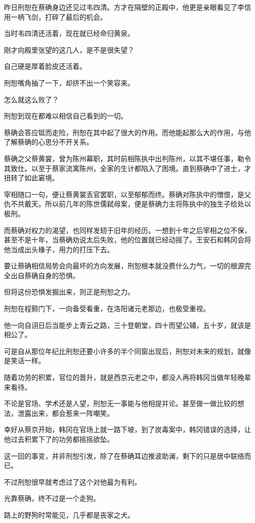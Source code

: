 昨日刑恕在蔡确身边还见过韦四清。方才在隔壁的正殿中，他更是亲眼看见了李信用一柄飞剑，打碎了最后的机会。

当时韦四清还活着，现在就已经命归黄泉。

刚才向殿里张望的这几人，是不是很失望？

自己硬是厚着脸皮还活着。

刑恕嘴角抽了一下，却挤不出一个笑容来。

怎么就这么败了？

刑恕到现在都难以相信自己看到的一切。

蔡确会答应铤而走险，刑恕在其中起了很大的作用。而他能起那么大的作用，与他了解蔡确的心思分不开关系。

蔡确之父蔡黄裳，曾为陈州幕职，其时前相陈执中出判陈州，以其不堪任事，勒令其致仕。以至于蔡家流寓陈州，全家的生计都陷入了困境。直到蔡确中了进士，才扭转了如此窘境。

宰相随口一句，便让蔡黄裳丢官罢职，以至郁郁而终。蔡确对陈执中的憎恨，是父仇不共戴天。所以前几年的陈世儒弑母案，便是蔡确力主将陈执中的独生子给处以极刑。

而蔡确对权力的渴望，也同样发轫于旧年的经历。一想到十年之后宰相之位不保，甚至不是十年，当蔡确劝说太后失败，他的位置就已经动摇了。王安石和韩冈会将他当成出头椽子，用力的打压下去。

要让蔡确相信局势会向最坏的方向发展，刑恕根本就没费什么力气，一切的根源完全出自蔡确自身的恐惧。

但将这份恐惧发掘出来，则正是刑恕之力。

刑恕在程颢门下，一向备受看重，在洛阳诸元老那边，也极受重视。

他一向自诩日后当能步上青云之路，三十登朝堂，四十而望公辅，五十岁，就该是相公了。

可是自从那位年纪比刑恕还要小许多的半个同窗出现后，刑恕对未来的规划，就像是笑话一样。

随着功劳的积累，官位的晋升，就是西京元老之中，都没人再将韩冈当做年轻晚辈来看待。

不论是官场、学术还是人望，刑恕无一事能与他相提并论。甚至做一做比较的想法，泄露出来，都会惹来一阵嘲笑。

幸好从蔡京开始，韩冈在官场上就一路下坡，到了炭毒案中，韩冈错误的选择，让他过去积累下了的功劳都摇摇欲坠。

这一回的事变，并非刑恕引发，除了在蔡确耳边推波助澜，剩下的只是居中联络而已。

不过刑恕很早就考虑过了这个对他最为有利。

光靠蔡确，终不过是一个走狗。

路上的野狗时常能见，几乎都是丧家之犬。

